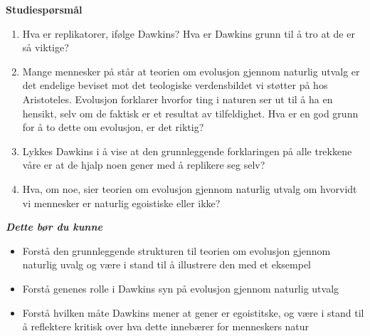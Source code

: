\documentclass[11pt, a4paper]{article}
\newenvironment{sectionbox}[1][]{%
    \begin{sectionboxinner}
    \textbf{\large #1}
    \vspace{1pt}
    \newline
}{%
    \end{sectionboxinner}
}
\begin{document}
\begin{sectionbox}[Studiespørsmål]

    \begin{enumerate}
        \item Hva er replikatorer, ifølge Dawkins? Hva er Dawkins grunn til å tro at de er så viktige?
        \item Mange mennesker på står at teorien om evolusjon gjennom naturlig utvalg er det endelige beviset mot det teologiske verdensbildet vi støtter på hos Aristoteles. Evolusjon forklarer hvorfor ting i naturen ser ut til å ha en hensikt, selv om de faktisk er et resultat av tilfeldighet. Hva er en god grunn for å to dette om evolusjon, er det riktig?
        \item Lykkes Dawkins i å vise at den grunnleggende forklaringen på alle trekkene våre er at de hjalp noen gener med å replikere seg selv?
        \item Hva, om noe, sier teorien om evolusjon gjennom naturlig utvalg om hvorvidt vi mennesker er naturlig egoistiske eller ikke?
    \end{enumerate}

    \textbf{\textit{Dette bør du kunne}}
    \begin{itemize}
        \item Forstå den grunnleggende strukturen til teorien om evolusjon gjennom naturlig uvalg og være i stand til å illustrere den med et eksempel
        \item Forstå genenes rolle i Dawkins syn på evolusjon gjennom naturlig utvalg
        \item Forstå hvilken måte Dawkins mener at gener er egoistitske, og være i stand til å reflektere kritisk over hva dette innebærer for menneskers natur
    \end{itemize}
\end{sectionbox}
\end{document}
